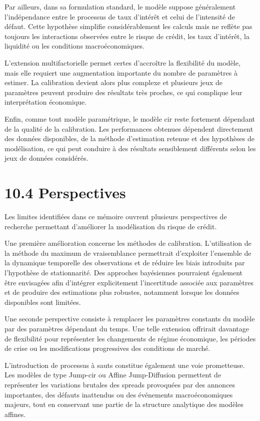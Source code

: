 Par ailleurs, dans sa formulation standard, le modèle suppose généralement l'indépendance entre le processus de taux d'intérêt et celui de l'intensité de défaut. Cette hypothèse simplifie considérablement les calculs mais ne reflète pas toujours les interactions observées entre le risque de crédit, les taux d'intérêt, la liquidité ou les conditions macroéconomiques.

L'extension multifactorielle permet certes d'accroître la flexibilité du modèle, mais elle requiert une augmentation importante du nombre de paramètres à estimer. La calibration devient alors plus complexe et plusieurs jeux de paramètres peuvent produire des résultats très proches, ce qui complique leur interprétation économique.

Enfin, comme tout modèle paramétrique, le modèle \gls{cir} reste fortement dépendant de la qualité de la calibration. Les performances obtenues dépendent directement des données disponibles, de la méthode d'estimation retenue et des hypothèses de modélisation, ce qui peut conduire à des résultats sensiblement différents selon les jeux de données considérés.


\section{10.4 Perspectives}

Les limites identifiées dans ce mémoire ouvrent plusieurs perspectives de recherche permettant d'améliorer la modélisation du risque de crédit.

Une première amélioration concerne les méthodes de calibration. L'utilisation de la méthode du maximum de vraisemblance permettrait d'exploiter l'ensemble de la dynamique temporelle des observations et de réduire les biais introduits par l'hypothèse de stationnarité. Des approches bayésiennes pourraient également être envisagées afin d'intégrer explicitement l'incertitude associée aux paramètres et de produire des estimations plus robustes, notamment lorsque les données disponibles sont limitées.

Une seconde perspective consiste à remplacer les paramètres constants du modèle par des paramètres dépendant du temps. Une telle extension offrirait davantage de flexibilité pour représenter les changements de régime économique, les périodes de crise ou les modifications progressives des conditions de marché.

L'introduction de processus à sauts constitue également une voie prometteuse. Les modèles de type Jump-\gls{cir} ou Affine Jump-Diffusion permettent de représenter les variations brutales des spreads provoquées par des annonces importantes, des défauts inattendus ou des événements macroéconomiques majeurs, tout en conservant une partie de la structure analytique des modèles affines.

